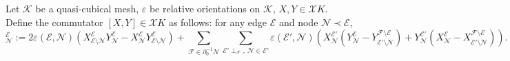 \begin{definition}
  Let $\mathcal{K}$ be a quasi-cubical mesh,
    $\varepsilon$ be relative orientations on $\mathcal{K}$,
    $X, Y \in \mathcal{X} K$.
  Define the commutator $[X, Y] \in \mathcal{X} K$ as follows:
  for any edge $\mathcal{E}$ and node $\mathcal{N} \prec \mathcal{E}$,
  \begin{equation}
    [X, Y]^{\mathcal{E}}_{\mathcal{N}}
    := 2 \varepsilon(\mathcal{E}, \mathcal{N})
      (   X^{\mathcal{E}}_{\mathcal{E} \setminus \mathcal{N}}
          Y^{\mathcal{E}}_{\mathcal{N}}
        - X^{\mathcal{E}}_{\mathcal{N}}
          Y^{\mathcal{E}}_{\mathcal{E} \setminus \mathcal{N}}
      )
      + \sum_{\mathcal{F} \in \partial_0^{-1} \mathcal{N}}
        \sum_{\mathcal{E}' \perp_{\mathcal{F}},\ \mathcal{N} \in \mathcal{E}'}
        \varepsilon(\mathcal{E}', \mathcal{N})
        ( X^{\mathcal{E}'}_{\mathcal{N}}
          (Y^{\mathcal{E}}_{\mathcal{N}}
           - Y^{\mathcal{F} \setminus \mathcal{E}}
            _{\mathcal{E}' \setminus \mathcal{N}})
          +
          Y^{\mathcal{E}'}_{\mathcal{N}}
          (X^{\mathcal{E}}_{\mathcal{N}}
           - X^{\mathcal{F} \setminus \mathcal{E}}
            _{\mathcal{E}' \setminus \mathcal{N}})
        ).
  \end{equation}
\end{definition}
